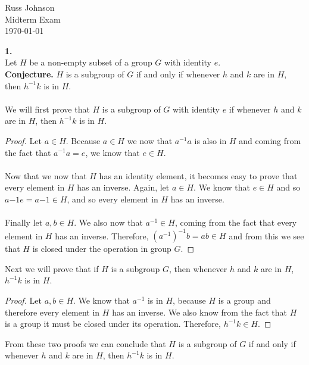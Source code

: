 \documentclass[11pt,a4paper]{article}
\begin{document}
\begin{flushright}
Russ Johnson\\
Midterm Exam\\
\today\\
\end{flushright}

{\bf 1.}\\
Let $H$ be a non-empty subset of a group $G$ with identity $e$.\\
{\bf Conjecture.} $H$ is a subgroup of $G$ if and only if whenever $h$ and $k$ are in $H$, then $h^{-1}k$ is in $H$.\\
~\\
We will first prove that $H$ is a subgroup of $G$ with identity $e$ if whenever $h$ and $k$ are in $H$, then $h^{-1}k$ is in $H$.
\begin{proof}
Let $a\in H$. Because $a\in H$ we now that $a^{-1}a$ is also in $H$ and coming from the fact that $a^{-1}a = e$, we know that $e\in H$.\\
~\\
Now that we now that $H$ has an identity element, it becomes easy to prove that every element in $H$ has an inverse. Again, let $a\in H$. We know that $e\in H$ and so $a{-1}e = a{-1} \in H$, and so every element in $H$ has an inverse.\\
~\\
Finally let $a,b \in H$. We also now that $a^{-1}\in H$, coming from the fact that every element in $H$ has an inverse. Therefore, $(a^{-1})^{-1}b = ab\in H$ and from this we see that $H$ is closed under the operation in group $G$.
\end{proof}

Next we will prove that if $H$ is a subgroup $G$, then whenever $h$ and $k$ are in $H$, $h^{-1}k$ is in $H$.

\begin{proof}
Let $a,b\in H$. We know that $a^{-1}$ is in $H$, because $H$ is a group and therefore every element in $H$ has an inverse. We also know from the fact that $H$ is a group it must be closed under its operation. Therefore, $h^{-1}k \in H$.
\end{proof} 

From these two proofs we can conclude that $H$ is a subgroup of $G$ if and only if whenever $h$ and $k$ are in $H$, then $h^{-1}k$ is in $H$.\\
\end{document}
